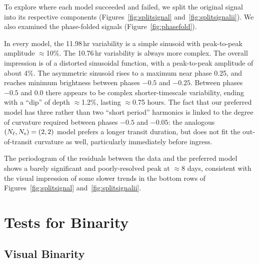 \documentclass[12pt,twocolumn,tighten]{aastex62}
\begin{document}
To explore where each model succeeded and failed, we split the
original signal into its respective components
(Figures~\ref{fig:splitsignal} and~\ref{fig:splitsignalii}).  We also
examined the phase-folded signals (Figure~\ref{fig:phasefold}).  

In every model, the 11.98$\,$hr variability is a simple sinusoid with
peak-to-peak amplitude $\approx$10\%.  The 10.76$\,$hr variability is
always more complex.  The overall impression is of a distorted
sinusoidal function, with a peak-to-peak amplitude of about 4\%.  The
asymmetric sinusoid rises to a maximum near phase 0.25, and reaches
minimum brightness between phases $-0.5$ and $-0.25$.  Between phases
$-0.5$ and $0.0$ there appears to be complex shorter-timescale
variability, ending with a ``dip'' of depth $\approx$1.2\%, lasting
$\approx$0.75 hours.  The fact that our preferred model has three
rather than two ``short period'' harmonics is linked to the degree of
curvature required between phases $-0.5$ and $-0.05$: the analogous
$(N_{\rm \ell},N_{\rm s})=(2,2)$ model prefers a longer transit
duration, but does not fit the out-of-transit curvature as well,
particularly immediately before ingress.

The periodogram of the residuals between the data and the preferred
model shows a barely significant and poorly-resolved peak at
$\approx$8 days, consistent with the visual impression of some slower
trends in the bottom rows of Figures~\ref{fig:splitsignal}
and~\ref{fig:splitsignalii}.

\section{Tests for Binarity}
\label{sec:gaia}

\subsection{Visual Binarity}
\label{subsec:blend}
\end{document}
